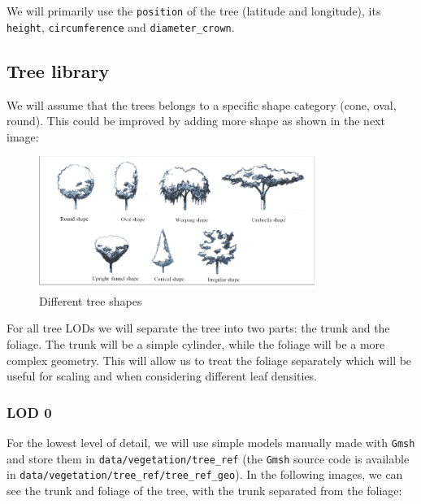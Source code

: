 \documentclass[12pt]{article}
\begin{document}
We will primarily use the \texttt{position} of the tree (latitude and
longitude), its \texttt{height}, \texttt{circumference} and \texttt{diameter\_crown}.

\subsection{Tree library}
We will assume that the trees belongs to a specific shape category (cone, oval, 
round). This could be improved by adding more shape as shown in the next image:
\begin{figure}[H]
    \centering
    \includegraphics[width=0.8\textwidth]{images/Different-types-of-the-trees-shape.png}
    \caption{Different tree shapes\cite{img:tree-shape}}
\end{figure}


For all tree LODs we will separate the tree into two parts: the trunk and the
foliage. The trunk will be a simple cylinder, while the foliage will be a more 
complex geometry. This will allow us to treat the foliage separately which will 
be useful for scaling and when considering different leaf densities.

\subsubsection{LOD 0}
For the lowest level of detail, we will use simple models manually made with 
\texttt{Gmsh}\cite{gmsh} and store them in \texttt{data/vegetation/tree\_ref} 
(the \texttt{Gmsh} source code is available in \texttt{data/vegetation/tree\_ref/tree\_ref\_geo}). 
In the following images, we can see the trunk and foliage of the tree, with the 
trunk separated from the foliage:
\end{document}
